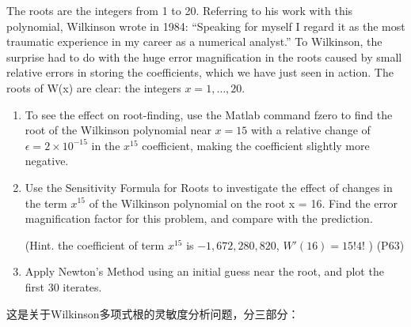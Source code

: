 The roots are the integers from 1 to 20. Referring to his work with this polynomial, Wilkinson wrote in 1984: “Speaking for myself I regard it as the most traumatic experience in my career as a numerical analyst.” To Wilkinson, the surprise had to do with the huge error magnification in the roots caused by small relative errors in storing the coefficients, which we have just seen in action. The roots of W(x) are clear: the integers $x = 1, \dots, 20$.

\begin{enumerate}
    \item  To see the effect on root-finding, use the Matlab command fzero to find the root of the Wilkinson polynomial near $x = 15$ with a relative change of $\epsilon = 2 × 10^{-15}$ in the $x^{15}$ coefficient, making the coefficient slightly more negative.

    \item Use the Sensitivity Formula for Roots to investigate the effect of changes in the term $x^{15}$ of the Wilkinson polynomial on the root x = 16. Find the error magnification factor for this problem, and compare with the prediction.

(Hint. the coefficient of term $x^{15}$ is $-1,672,280,820$, $W'(16) = 15!4!$ ) (P63)

\item Apply Newton’s Method using an initial guess near the root, and plot the first 30 iterates.
\end{enumerate}



这是关于Wilkinson多项式根的灵敏度分析问题，分三部分：

